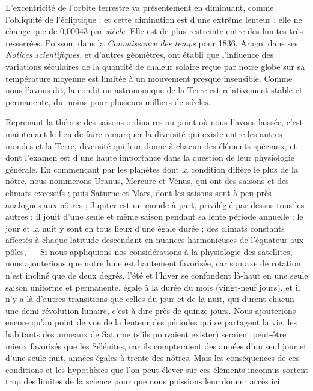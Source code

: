 \documentclass[a4paper, 11pt, oneside]{article}
\begin{document}
L'excentricité de l'orbite terrestre va présentement en diminuant, comme l'obliquité de l'écliptique ; et cette diminution est d'une extrême lenteur : elle ne change que de 0,00043 par \emph{siècle}. Elle est de plus restreinte entre des limites très-resserrées. Poisson, dans la \emph{Connaissance des temps} pour 1836, Arago, dans ses \emph{Notices scientifiques}, et d'autres géomètres, ont établi que l'influence des variations séculaires de la quantité de chaleur solaire reçue par notre globe sur sa température moyenne est limitée à un mouvement presque insensible. Comme nous l'avons dit, la condition astronomique de la Terre est relativement stable et permanente, du moins pour plusieurs milliers de siècles.

Reprenant la théorie des saisons ordinaires au point où nous l'avons laissée, c'est maintenant le lieu de faire remarquer la diversité qui existe entre les autres mondes et la Terre, diversité qui leur donne à chacun des éléments spéciaux, et dont l'examen est d'une haute importance dans la question de leur physiologie générale. En commençant par les planètes dont la condition diffère le plus de la nôtre, nous nommerons Uranus, Mercure et Vénus, qui ont des saisons et des climats excessifs ; puis Saturne et Mars, dont les saisons sont à peu près analogues aux nôtres ; Jupiter est un monde à part, privilégié par-dessus tous les autres : il jouit d'une seule et même saison pendant sa lente période annuelle ; le jour et la nuit y sont en tous lieux d'une égale durée ; des climats constants affectés à chaque latitude descendant en nuances harmonieuses de l'équateur aux pôles, --- Si nous appliquions nos considérations à la physiologie des satellites, nous ajouterions que notre lune est hautement favorisée, car son axe de rotation n'est incliné que de deux degrés, l'été et l'hiver se confondent là-haut en une seule saison uniforme et permanente, égale à la durée du mois (vingt-neuf jours), et il n'y a là d'autres transitions que celles du jour et de la nuit, qui durent chacun une demi-révolution lunaire, c'est-à-dire près de quinze jours. Nous ajouterions encore qu'au point de vue de la lenteur des périodes qui se partagent la vie, les habitants des anneaux de Saturne (s'ils pouvaient exister) seraient peut-être mieux favorisés que les Sélénites, car ils compteraient des années d'un seul jour et d'une seule nuit, années égales à trente des nôtres. Mais les conséquences de ces conditions et les hypothèses que l'on peut élever sur ces éléments inconnus sortent trop des limites de la science pour que nous puissions leur donner accès ici.
\end{document}
